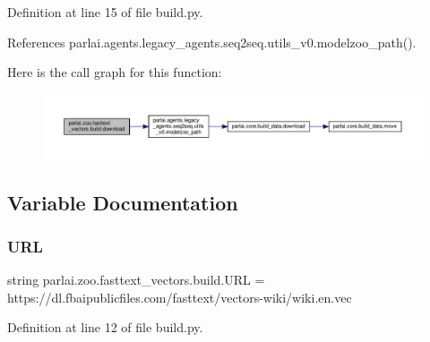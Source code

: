 Definition at line 15 of file build.\+py.



References parlai.\+agents.\+legacy\+\_\+agents.\+seq2seq.\+utils\+\_\+v0.\+modelzoo\+\_\+path().

Here is the call graph for this function\+:
\nopagebreak
\begin{figure}[H]
\begin{center}
\leavevmode
\includegraphics[width=350pt]{namespaceparlai_1_1zoo_1_1fasttext__vectors_1_1build_a7aab81733d26caeb7ab607173b53932b_cgraph}
\end{center}
\end{figure}


\subsection{Variable Documentation}
\mbox{\label{namespaceparlai_1_1zoo_1_1fasttext__vectors_1_1build_a1400fb8120aae9b826dbdf00b35be0ac}} 
\subsubsection{\texorpdfstring{U\+RL}{URL}}
{\footnotesize\ttfamily string parlai.\+zoo.\+fasttext\+\_\+vectors.\+build.\+U\+RL = \textquotesingle{}https\+://dl.\+fbaipublicfiles.\+com/fasttext/vectors-\/wiki/wiki.\+en.\+vec\textquotesingle{}}



Definition at line 12 of file build.\+py.

